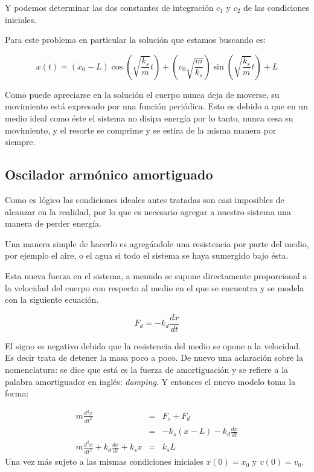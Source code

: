 Y podemos determinar las dos constantes de integración $c_1$ y $c_2$ de las condiciones iniciales.

Para este problema en particular la solución que estamos buscando es:

\begin{equation}
x(t) = \left(x_0 - L \right) \cos{\left(\sqrt{\frac{k_s}{m}} t \right)} +  \left( v_0 \sqrt{\frac{m}{k_s}}\right) \sin{\left(\sqrt{\frac{k_s}{m}} t \right)} + L
\end{equation}

Como puede apreciarse en la solución el cuerpo nunca deja de moverse, su movimiento está expresado por una función periódica.
Esto es debido a que en un medio ideal como éste el sistema no disipa energía por lo tanto, nunca cesa su movimiento, y el resorte se comprime y se estira de la misma manera por siempre.

\subsection{Oscilador armónico amortiguado}

Como es lógico las condiciones ideales antes tratadas son casi imposibles de alcanzar en la realidad, por lo que es necesario agregar a nuestro sistema una manera de perder energía.

Una manera simple de hacerlo es agregándole una resistencia por parte del medio, por ejemplo el aire, o el agua si todo el sistema se haya sumergido bajo ésta. 

Esta nueva fuerza en el sistema, a menudo se supone directamente proporcional a la velocidad del cuerpo con respecto al medio en el que se encuentra y se modela con la siguiente ecuación.

\begin{equation}
F_d = -k_d\frac{dx}{dt}
\end{equation}

El signo es negativo debido que la resistencia del medio se opone a la velocidad. Es decir trata de detener la masa poco a poco.
De nuevo una aclaración sobre la nomenclatura: se dice que está es la fuerza de amortiguación y se refiere a la palabra amortiguador en inglés: \foreignlanguage{english}{\emph{damping}}.
Y entonces el nuevo modelo toma la forma:

\begin{eqnarray}
m \frac{d^2x}{dt^2} & = & F_s + F_d \nonumber \\
& = & -k_s \left( x - L \right) -k_d\frac{dx}{dt} \nonumber \\
m \frac{d^2x}{dt^2} + k_d\frac{dx}{dt} + k_s x & = & k_s L 
\end{eqnarray}
Una vez más sujeto a las mismas condiciones iniciales $x(0) = x_0$ y $ v(0) = v_0$.

